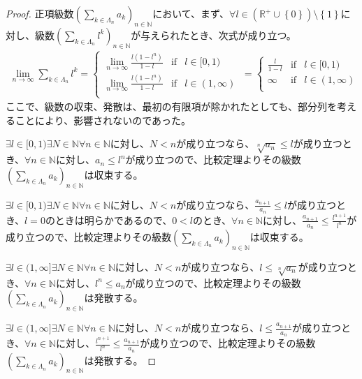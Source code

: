 \documentclass[dvipdfmx]{jsarticle}
\begin{document}
\begin{proof}
正項級数$\left( \sum_{k \in \varLambda_{n}} a_{k} \right)_{n \in \mathbb{N}}$において、まず、$\forall l \in \left( \mathbb{R}^{+} \cup \left\{ 0 \right\} \right) \setminus \left\{ 1 \right\}$に対し、級数$\left( \sum_{k \in \varLambda_{n}} l^{k} \right)_{n \in \mathbb{N}}$が与えられたとき、次式が成り立つ。
\begin{align*}
\lim_{n \rightarrow \infty}{\sum_{k \in \varLambda_{n}} l^{k}} = \left\{ \begin{matrix}
\lim_{n \rightarrow \infty}\frac{l\left( 1 - l^{n} \right)}{1 - l} & \mathrm{if} & l \in [ 0,1) \\
\lim_{n \rightarrow \infty}\frac{l\left( 1 - l^{n} \right)}{1 - l} & \mathrm{if} & l \in (1,\infty) \\
\end{matrix} \right.\  = \left\{ \begin{matrix}
\frac{l}{1 - l} & \mathrm{if} & l \in [ 0,1) \\
\infty & \mathrm{if} & l \in (1,\infty) \\
\end{matrix} \right.\ 
\end{align*}
ここで、級数の収束、発散は、最初の有限項が除かれたとしても、部分列を考えることにより、影響されないのであった。\par
$\exists l \in [ 0,1)\exists N \in \mathbb{N}\forall n \in \mathbb{N}$に対し、$N < n$が成り立つなら、$\sqrt[n]{a_{n}} \leq l$が成り立つとき、$\forall n \in \mathbb{N}$に対し、$a_{n} \leq l^{n}$が成り立つので、比較定理よりその級数$\left( \sum_{k \in \varLambda_{n}} a_{k} \right)_{n \in \mathbb{N}}$は収束する。\par
$\exists l \in [ 0,1)\exists N \in \mathbb{N}\forall n \in \mathbb{N}$に対し、$N < n$が成り立つなら、$\frac{a_{n + 1}}{a_{n}} \leq l$が成り立つとき、$l = 0$のときは明らかであるので、$0 < l$のとき、$\forall n \in \mathbb{N}$に対し、$\frac{a_{n + 1}}{a_{n}} \leq \frac{l^{n + 1}}{l^{n}}$が成り立つので、比較定理よりその級数$\left( \sum_{k \in \varLambda_{n}} a_{k} \right)_{n \in \mathbb{N}}$は収束する。\par
$\exists l \in (1,\infty]\exists N \in \mathbb{N}\forall n \in \mathbb{N}$に対し、$N < n$が成り立つなら、$l \leq \sqrt[n]{a_{n}}$が成り立つとき、$\forall n \in \mathbb{N}$に対し、$l^{n} \leq a_{n}$が成り立つので、比較定理よりその級数$\left( \sum_{k \in \varLambda_{n}} a_{k} \right)_{n \in \mathbb{N}}$は発散する。\par
$\exists l \in (1,\infty]\exists N \in \mathbb{N}\forall n \in \mathbb{N}$に対し、$N < n$が成り立つなら、$l \leq \frac{a_{n + 1}}{a_{n}}$が成り立つとき、$\forall n \in \mathbb{N}$に対し、$\frac{l^{n + 1}}{l^{n}} \leq \frac{a_{n + 1}}{a_{n}}$が成り立つので、比較定理よりその級数$\left( \sum_{k \in \varLambda_{n}} a_{k} \right)_{n \in \mathbb{N}}$は発散する。
\end{proof}
\end{document}
